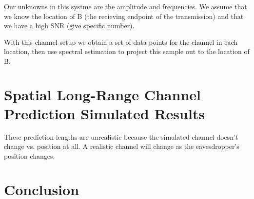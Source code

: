\documentclass[11pt]{article} %
\begin{document}
Our unknowns in this systme are the amplitude and frequencies. We assume that we know the location of B (the recieving endpoint of the transmission) and that we have a high SNR (give specific number).

With this channel setup we obtain a set of data points for the channel in each location, then use spectral estimation to project this sample out to the location of B.





\section{Spatial Long-Range Channel Prediction Simulated Results}\label{simresults}



These prediction lengths are unrealistic because the simulated channel doesn't change vs. position at all.  A realistic channel will change as the eavesdropper's position changes. 

\section{Conclusion}

{}
\end{document}
